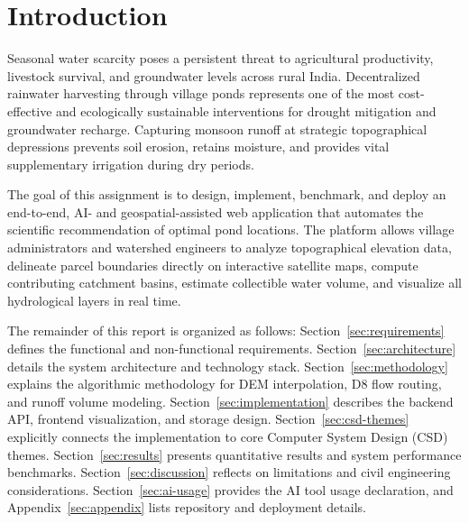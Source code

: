 \documentclass[manuscript,screen,review]{acmart}
\begin{document}

\maketitle

\section{Introduction}
\label{sec:intro}
Seasonal water scarcity poses a persistent threat to agricultural productivity, livestock survival, and groundwater levels across rural India. Decentralized rainwater harvesting through village ponds represents one of the most cost-effective and ecologically sustainable interventions for drought mitigation and groundwater recharge. Capturing monsoon runoff at strategic topographical depressions prevents soil erosion, retains moisture, and provides vital supplementary irrigation during dry periods.

The goal of this assignment is to design, implement, benchmark, and deploy an end-to-end, AI- and geospatial-assisted web application that automates the scientific recommendation of optimal pond locations. The platform allows village administrators and watershed engineers to analyze topographical elevation data, delineate parcel boundaries directly on interactive satellite maps, compute contributing catchment basins, estimate collectible water volume, and visualize all hydrological layers in real time.

The remainder of this report is organized as follows: Section~\ref{sec:requirements} defines the functional and non-functional requirements. Section~\ref{sec:architecture} details the system architecture and technology stack. Section~\ref{sec:methodology} explains the algorithmic methodology for DEM interpolation, D8 flow routing, and runoff volume modeling. Section~\ref{sec:implementation} describes the backend API, frontend visualization, and storage design. Section~\ref{sec:csd-themes} explicitly connects the implementation to core Computer System Design (CSD) themes. Section~\ref{sec:results} presents quantitative results and system performance benchmarks. Section~\ref{sec:discussion} reflects on limitations and civil engineering considerations. Section~\ref{sec:ai-usage} provides the AI tool usage declaration, and Appendix~\ref{sec:appendix} lists repository and deployment details.
\end{document}
